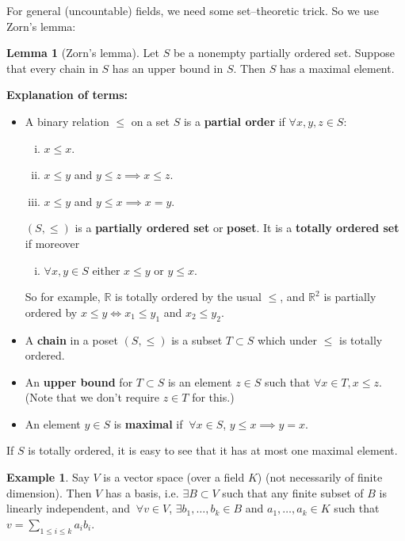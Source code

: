 \documentclass{article}
\theoremstyle{definition}
\newtheorem{lemma}[theorem]{Lemma}
\newtheorem{example}{Example}[section]
\begin{document}
For general (uncountable) fields, we need some set--theoretic trick. So we use Zorn's lemma:
\begin{lemma}[Zorn's lemma]
    Let $S$ be a nonempty partially ordered set. Suppose that every chain in $S$ has an upper bound in $S$. Then $S$ has a maximal element.
\end{lemma}
\textbf{Explanation of terms:}
\begin{itemize}
    \item A binary relation $\le$ on a set $S$ is a \textbf{partial order} if $\forall x,y,z \in S$:
    \begin{enumerate}[(i)]
        \item $x\le x$.
        \item $x\le y$ and $y\le z \implies x\le z$.
        \item $x\le y$ and $y\le x \implies x=y$.
    \end{enumerate}  
    $(S,\le)$ is a \textbf{partially ordered set} or \textbf{poset}. It is a \textbf{totally ordered set} if moreover
    \begin{enumerate}[(iv)]
        \item $\forall x,y \in S$ either $x\le y$ or $y\le x$.
    \end{enumerate}
    So for example, $\mathbb{R}$ is totally ordered by the usual $\le$, and $\mathbb{R}^2$ is partially ordered by $x\le y \iff x_1\le y_1$ and $x_2\le y_2$.
    \item A \textbf{chain} in a poset $(S,\le )$ is a subset $T \subset S$ which under $\le $ is totally ordered.
    \item An \textbf{upper bound} for $T \subset S$ is an element $z \in S$ such that $\forall x \in T, x\le z$. (Note that we don't require $z \in T$ for this.)
    \item An element $y \in S$ is \textbf{maximal} if $~\forall x \in S$, $y\le x \implies y=x$. 
\end{itemize} 
If $S$ is totally ordered, it is easy to see that it has at most one maximal element.
\begin{example}
    Say $V$ is a vector space (over a field $K$) (not necessarily of finite dimension). Then $V$ has a basis, i.e. $\exists B \subset V$ such that any finite subset of $B$ is linearly independent, and $~\forall v \in V$, $\exists b_1,\ldots,b_k \in B$ and $a_1,\ldots,a_k \in K$ such that $v = \sum_{1\le i\le k}^{} a_ib_i$.
\end{example}
\end{document}
